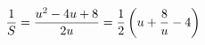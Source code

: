 \documentclass[preview]{standalone}
\begin{document}
\begin{align*}
\special{dvisvgm:raw <g id='unique000'>}\frac{1}{S}=\frac{u^2-4u+8}{2u}=\frac12\left(u+\frac8u-4\right)\special{dvisvgm:raw </g>}
\end{align*}
\end{document}
